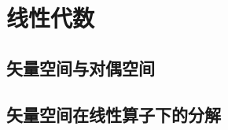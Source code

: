 \renewcommand\chapterimg{../Pictures/3.png}
\chapter{线性代数}

\section{矢量空间与对偶空间}

\section{矢量空间在线性算子下的分解}